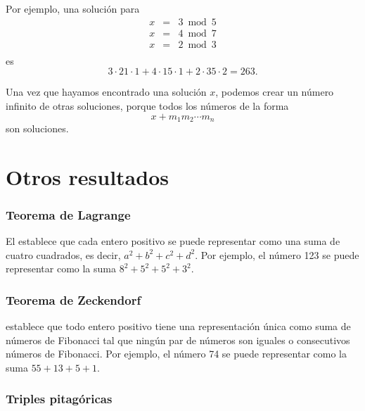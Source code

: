 Por ejemplo, una solución para
\[
\begin{array}{lcl}
x & = & 3 \bmod 5 \\
x & = & 4 \bmod 7 \\
x & = & 2 \bmod 3 \\
\end{array}
\]
es
\[ 3 \cdot 21 \cdot 1 + 4 \cdot 15 \cdot 1 + 2 \cdot 35 \cdot 2 = 263.\]

Una vez que hayamos encontrado una solución $x$,
podemos crear un número infinito de otras soluciones,
porque todos los números de la forma
\[x+m_1 m_2 \cdots m_n\]
son soluciones.

\section{Otros resultados}

\subsubsection{Teorema de Lagrange}


El 
establece que cada entero positivo
se puede representar como una suma de cuatro cuadrados, es decir,
$a^2+b^2+c^2+d^2$.
Por ejemplo, el número 123 se puede representar
como la suma $8^2+5^2+5^2+3^2$.

\subsubsection{Teorema de Zeckendorf}




establece que todo
entero positivo tiene una representación única
como suma de números de Fibonacci tal que
ningún par de números son iguales o consecutivos
números de Fibonacci.
Por ejemplo, el número 74 se puede representar
como la suma $55+13+5+1$.

\subsubsection{Triples pitagóricas}


